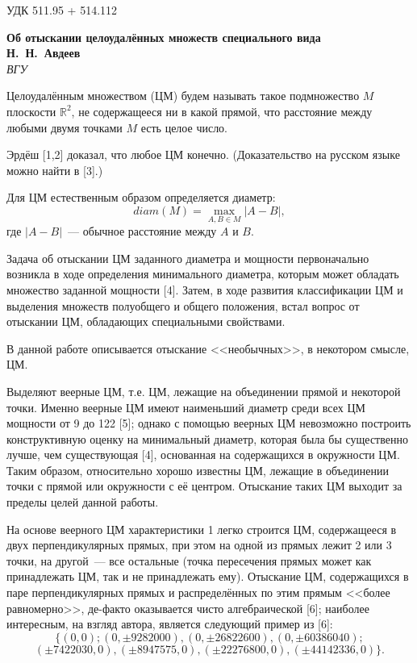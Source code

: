 \documentclass[12pt]{article}
\begin{document}
\noindent УДК 511.95 + 514.112

\begin{center}
\textbf{Об отыскании целоудалённых множеств специального вида} \\[3mm]
\textbf{Н.~Н.~Авдеев}\\[2mm]
\emph{ВГУ}
\end{center}

Целоудалённым множеством (ЦМ) будем называть такое подмножество $M$ плоскости $\mathbb{R}^2$,
не содержащееся ни в какой прямой,
что расстояние между любыми двумя точками $M$ есть целое число.

Эрдёш [1,2] доказал, что любое ЦМ конечно.
(Доказательство на русском языке можно найти в [3].)

Для ЦМ естественным образом определяется диаметр:
$$
	diam(M) = \max_{A,B\in M} |A-B|,
$$
где $|A-B|$~--- обычное расстояние между $A$ и $B$.

Задача об отыскании ЦМ заданного диаметра и мощности первоначально возникла
в ходе определения минимального диаметра,
которым может обладать множество заданной мощности [4].
Затем, в ходе развития классификации ЦМ и выделения множеств полуобщего и общего положения,
встал вопрос от отыскании ЦМ, обладающих специальными свойствами.


В данной работе описывается отыскание <<необычных>>, в некотором смысле, ЦМ.

Выделяют веерные ЦМ, т.е. ЦМ, лежащие на объединении прямой и некоторой точки.
Именно веерные ЦМ имеют наименьший диаметр среди всех ЦМ мощности от 9 до 122 [5];
однако с помощью веерных ЦМ невозможно построить конструктивную оценку на минимальный диаметр,
которая была бы существенно лучше, чем существующая [4], основанная на содержащихся в окружности ЦМ.
Таким образом, относительно хорошо известны ЦМ, лежащие в объединении точки с прямой или окружности с её центром.
Отыскание таких ЦМ выходит за пределы целей данной работы.

На основе веерного ЦМ характеристики 1 легко строится ЦМ, содержащееся в двух перпендикулярных прямых,
при этом на одной из прямых лежит 2 или 3 точки, на другой~--- все остальные
(точка пересечения прямых может как принадлежать ЦМ, так и не принадлежать ему).
Отыскание ЦМ, содержащихся в паре перпендикулярных прямых и распределённых по этим прямым
<<более равномерно>>, де-факто оказывается чисто алгебраической [6];
наиболее интересным, на взгляд автора, является следующий пример из [6]:
$$
\{
(0,0);
(0,\pm 9282000),
(0,\pm 26822600),
(0,\pm 60386040);
$$
$$
(\pm 7422030,0),
(\pm 8947575, 0),
(\pm 22276800,0),
(\pm 44142336,0)
\}
.
$$
\end{document}
